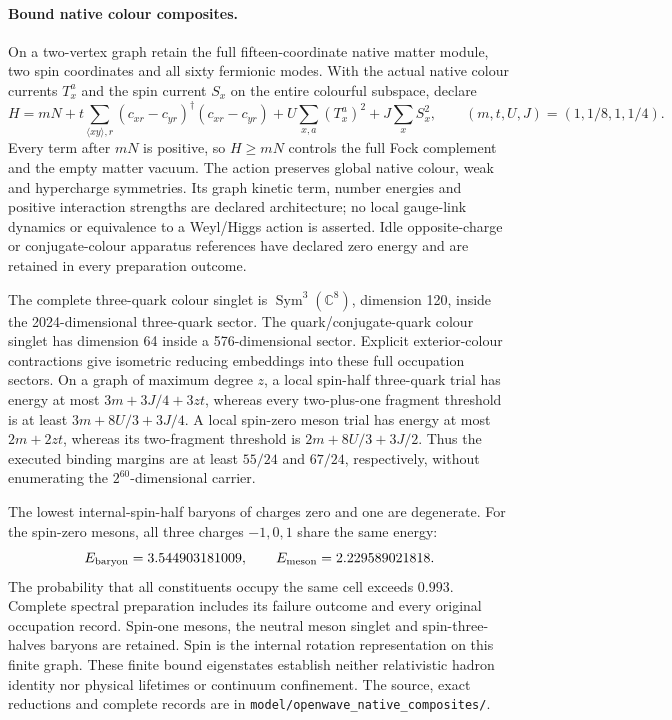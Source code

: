 \paragraph{Bound native colour composites.}
On a two-vertex graph retain the full fifteen-coordinate native matter module,
two spin coordinates and all sixty fermionic modes. With the actual native
colour currents $T_x^a$ and the spin current $S_x$ on the entire colourful
subspace, declare
\[
 H=mN+t\sum_{\langle xy\rangle,r}(c_{xr}-c_{yr})^\dagger(c_{xr}-c_{yr})
      +U\sum_{x,a}(T_x^a)^2+J\sum_x S_x^2,
 \qquad (m,t,U,J)=(1,1/8,1,1/4).
\]
Every term after $mN$ is positive, so $H\geq mN$ controls the full Fock
complement and the empty matter vacuum. The action preserves global native
colour, weak and hypercharge symmetries. Its graph kinetic term, number
energies and positive interaction strengths are declared architecture;
no local gauge-link dynamics or equivalence to a Weyl/Higgs action is asserted.
Idle opposite-charge or conjugate-colour apparatus references have declared
zero energy and are retained in every preparation outcome.

The complete three-quark colour singlet is
$\operatorname{Sym}^3(\mathbb C^8)$, dimension 120, inside the 2024-dimensional
three-quark sector. The quark/conjugate-quark colour singlet has dimension 64
inside a 576-dimensional sector. Explicit exterior-colour contractions give
isometric reducing embeddings into these full occupation sectors. On a graph
of maximum degree $z$, a local spin-half three-quark trial has energy at most
$3m+3J/4+3zt$, whereas every two-plus-one fragment threshold is at least
$3m+8U/3+3J/4$. A local spin-zero meson trial has energy at most $2m+2zt$,
whereas its two-fragment threshold is $2m+8U/3+3J/2$. Thus the executed
binding margins are at least $55/24$ and $67/24$, respectively, without
enumerating the $2^{60}$-dimensional carrier.

The lowest internal-spin-half baryons of charges zero and one are degenerate.
For the spin-zero mesons, all three charges $-1,0,1$ share the same energy:
\[
 E_{\rm baryon}=3.544903181009,\qquad E_{\rm meson}=2.229589021818.
\]
The probability that all constituents occupy the same cell exceeds $0.993$.
Complete spectral preparation includes its failure outcome and every original
occupation record. Spin-one mesons, the neutral meson singlet and spin-three-halves
baryons are retained. Spin is the internal rotation representation on this
finite graph. These finite bound eigenstates establish neither relativistic
hadron identity nor physical lifetimes or continuum confinement.
The source, exact reductions and complete records are in
\texttt{model/openwave\_native\_composites/}.
